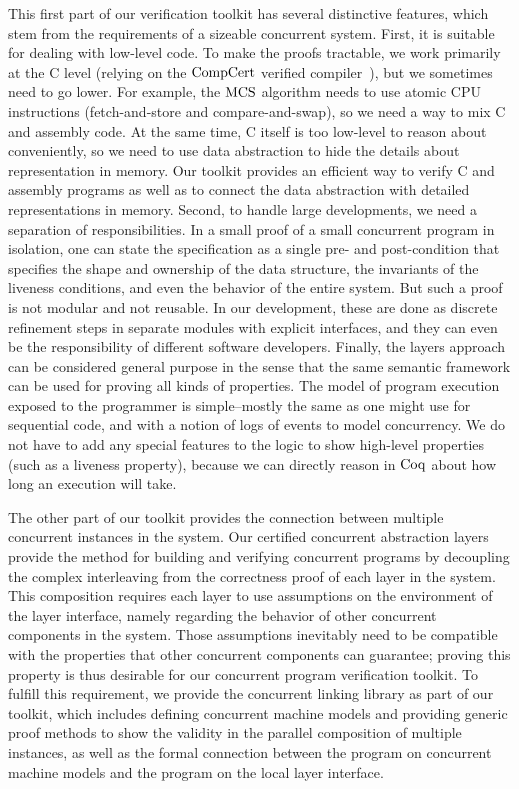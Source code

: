 This first part of our verification toolkit has several distinctive features, which stem from the requirements of a sizeable concurrent system. 
First, it is suitable for dealing with low-level code.
To make the proofs tractable, we work primarily at the C level (relying on the $\mathrm{CompCert}$ verified compiler~\cite{compcert}), 
but we sometimes need to go lower. For example, the $\mathrm{MCS}$ algorithm needs to use atomic CPU instructions (fetch-and-store and compare-and-swap), 
so we need a way to mix C and assembly code. 
At the same time, C itself is too low-level to reason about conveniently, 
so we need to use data abstraction to hide the details about representation in memory. 
Our toolkit provides an efficient way to verify C and assembly programs as well as to connect the data abstraction with detailed representations in memory. 
Second, to handle large developments, we need a separation of responsibilities. 
In a small proof of a small concurrent program in isolation, one can state the specification as a single pre- and post-condition that specifies the shape and ownership of the data structure, 
the invariants of the liveness conditions, and even the behavior of the entire system. 
But such a proof is not modular and not reusable. 
In our development, these are done as discrete refinement steps in separate modules with explicit interfaces, and they can even be the responsibility of different software developers. 
Finally, the layers approach can be considered general purpose in the sense that the same semantic framework can be used for proving all kinds of properties. 
The model of program execution exposed to the programmer is simple--mostly the same as one might use for sequential code, and with a notion of logs of events to model concurrency. 
We do not have to add any special features to the logic to show high-level properties (such as a liveness property), because we can directly reason in $\mathrm{Coq}$ about how long an execution will take. 
 
The other part of our toolkit provides the connection between multiple concurrent instances in the system. 
Our certified concurrent abstraction layers provide the method for building and verifying concurrent programs by decoupling the complex interleaving from the correctness proof of each layer in the system. 
This composition requires each layer to use assumptions on the environment of the layer interface, 
namely regarding the behavior of other concurrent components in the system. 
Those assumptions inevitably need to be compatible with the properties that other concurrent components can guarantee; 
proving this property is thus desirable for our concurrent program verification toolkit. 
To fulfill this requirement, we provide the concurrent linking library as part of our toolkit, 
which includes defining concurrent machine models and providing generic proof methods to show the validity in the parallel composition of multiple instances, 
as well as the formal connection between the program on concurrent machine models and the program on the local layer interface. 

